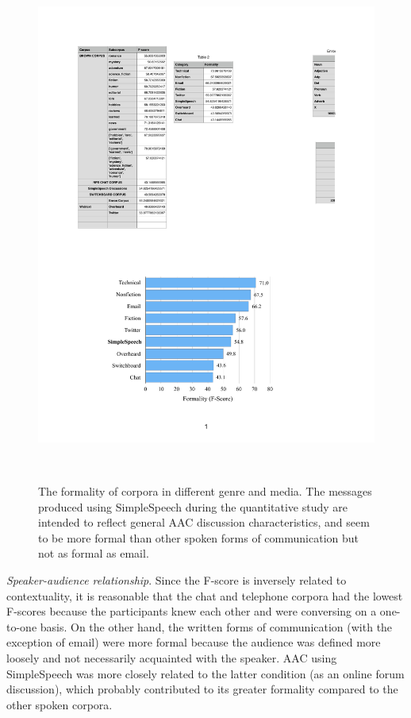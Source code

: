 \begin{figure}
	\centering
	\includegraphics[width=\columnwidth,keepaspectratio]{figures/formality_comparison}
	\caption{The formality of corpora in different genre and media. The messages produced using SimpleSpeech during the quantitative study are intended to reflect general AAC discussion characteristics, and seem to be more formal than other spoken forms of communication but not as formal as email.}~\label{fig:formality}
\end{figure}

\emph{Speaker-audience relationship}. 
Since the F-score is inversely related to contextuality, it is reasonable that the chat and telephone corpora had the lowest F-scores because the participants knew each other and were conversing on a one-to-one basis. 
On the other hand, the written forms of communication (with the exception of email) were more formal because the audience was defined more loosely and not necessarily acquainted with the speaker.
AAC using SimpleSpeech was more closely related to the latter condition (as an online forum discussion), which probably contributed to its greater formality compared to the other spoken corpora.

